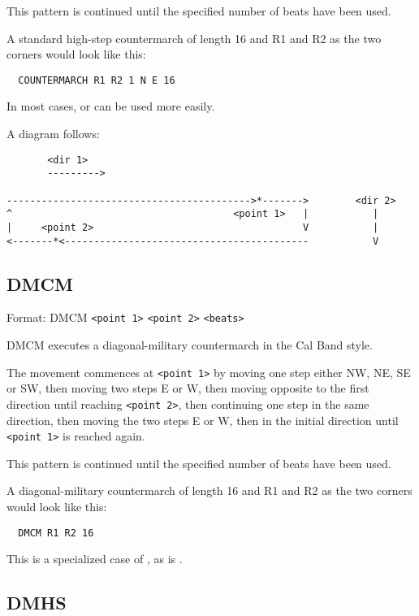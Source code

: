 This pattern is continued until the specified number of beats have been used.

A standard high-step countermarch of length 16 and R1 and R2 as the two
corners would look like this:
\begin{verbatim}
  COUNTERMARCH R1 R2 1 N E 16
\end{verbatim}

In most cases,  or  can be used
more easily.

A diagram follows:
                                         
\begin{verbatim}
       <dir 1>
       --------->

------------------------------------------>*------->        <dir 2>
^                                      <point 1>   |           |
|     <point 2>                                    V           |
<-------*<------------------------------------------           V
\end{verbatim}

\subsection{DMCM}\label{dmcm}

Format: DMCM \verb$<point 1>$ \verb$<point 2>$ \verb$<beats>$

DMCM executes a diagonal-military countermarch in the Cal Band style.

The movement commences at \verb$<point 1>$ by moving one step either NW, NE,
SE or SW, then moving two steps E or W, then moving opposite to the first
direction until reaching \verb$<point 2>$, then continuing one step in the
same direction, then moving the two steps E or W, then in the initial
direction until \verb$<point 1>$ is reached again.

This pattern is continued until the specified number of beats have been used.

A diagonal-military countermarch of length 16 and R1 and R2 as the two
corners would look like this:
\begin{verbatim}
  DMCM R1 R2 16
\end{verbatim}

This is a specialized case of , as is
.

\subsection{DMHS}\label{dmhs}

